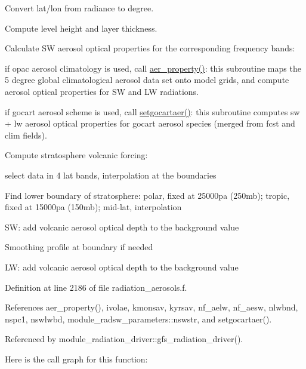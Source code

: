 \begin{DoxyEnumerate}
\item Convert lat/lon from radiance to degree.
\item Compute level height and layer thickness.
\item Calculate SW aerosol optical properties for the corresponding frequency bands\+:
\begin{DoxyItemize}
\item if opac aerosol climatology is used, call \hyperlink{group__module__radiation__aerosols_ga494892c147b1e14ffb241e413bc17a8b}{aer\+\_\+property()}\+: this subroutine maps the 5 degree global climatological aerosol data set onto model grids, and compute aerosol optical properties for SW and LW radiations.
\item if gocart aerosol scheme is used, call \hyperlink{group__module__radiation__aerosols_ga04ce3c11b81d0a0b025f79c4f29acfb8}{setgocartaer()}\+: this subroutine computes sw + lw aerosol optical properties for gocart aerosol species (merged from fcst and clim fields).
\end{DoxyItemize}
\item Compute stratosphere volcanic forcing\+:
\begin{DoxyItemize}
\item select data in 4 lat bands, interpolation at the boundaries
\item Find lower boundary of stratosphere\+: polar, fixed at 25000pa (250mb); tropic, fixed at 15000pa (150mb); mid-\/lat, interpolation
\item SW\+: add volcanic aerosol optical depth to the background value
\item Smoothing profile at boundary if needed
\item LW\+: add volcanic aerosol optical depth to the background value 
\end{DoxyItemize}
\end{DoxyEnumerate}

Definition at line 2186 of file radiation\+\_\+aerosols.\+f.



References aer\+\_\+property(), ivolae, kmonsav, kyrsav, nf\+\_\+aelw, nf\+\_\+aesw, nlwbnd, nspc1, nswlwbd, module\+\_\+radsw\+\_\+parameters\+::nswstr, and setgocartaer().



Referenced by module\+\_\+radiation\+\_\+driver\+::gfs\+\_\+radiation\+\_\+driver().

Here is the call graph for this function\+:
\mbox{\label{group__module__radiation__aerosols_ga04ce3c11b81d0a0b025f79c4f29acfb8}} 
